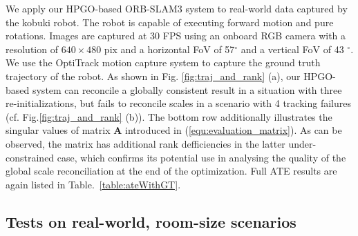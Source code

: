 \documentclass[letterpaper, 10 pt, conference]{ieeeconf}  %
\begin{document}
We apply our HPGO-based ORB-SLAM3 system to real-world data captured by the kobuki robot. The robot is capable of executing forward motion and pure rotations. Images are captured at 30 FPS using an onboard RGB camera with a resolution of $640 \times 480$ pix and a horizontal FoV of 57$^{\circ}$ and a vertical FoV of 43 $^{\circ}$. We use the OptiTrack motion capture system to capture the ground truth trajectory of the robot. As shown in Fig. \ref{fig:traj_and_rank} (a), our HPGO-based system can reconcile a globally consistent result in a situation with three re-initializations, but fails to reconcile scales in a scenario with 4 tracking failures (cf. Fig.\ref{fig:traj_and_rank} (b)). The bottom row additionally illustrates the singular values of matrix $\mathbf{A}$ introduced in (\ref{equ:evaluation_matrix}). As can be observed, the matrix has additional rank defficiencies in the latter under-constrained case, which confirms its potential use in analysing the quality of the global scale reconciliation at the end of the optimization. Full ATE results are again listed in Table.~\ref{table:ateWithGT}.



\subsection{Tests on real-world, room-size scenarios}
\end{document}
